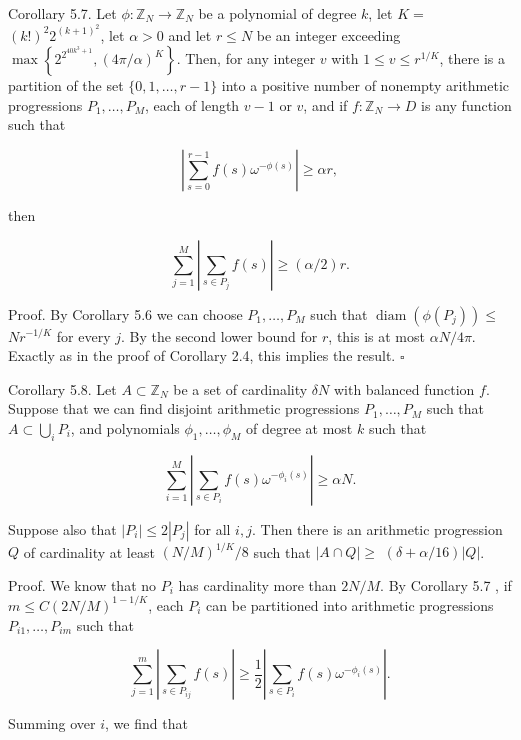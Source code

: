 \documentclass[10pt]{article}
\begin{document}
Corollary 5.7. Let $\phi: \mathbb{Z}_{N} \rightarrow \mathbb{Z}_{N}$ be a polynomial of degree $k$, let $K=$ $(k!)^{2} 2^{(k+1)^{2}}$, let $\alpha>0$ and let $r\leqslant N$ be an integer exceeding $\max \left\{2^{2^{40 k^{3}+1}},(4 \pi / \alpha)^{K}\right\}$. Then, for any integer $v$ with $1 \leqslant v \leqslant r^{1 / K}$, there is a partition of the set $\{0,1, \ldots, r-1\}$ into a positive number of nonempty arithmetic progressions $P_{1}, \ldots, P_{M}$, each of length $v-1$ or $v$, and if $f: \mathbb{Z}_{N} \rightarrow D$ is any function such that

$$
\left|\sum_{s=0}^{r-1} f(s) \omega^{-\phi(s)}\right| \geqslant \alpha r,
$$

then

$$
\sum_{j=1}^{M}\left|\sum_{s \in P_{j}} f(s)\right| \geqslant(\alpha / 2) r .
$$

Proof. By Corollary 5.6 we can choose $P_{1}, \ldots, P_{M}$ such that $\operatorname{diam}\left(\phi\left(P_{j}\right)\right) \leqslant$ $N r^{-1 / K}$ for every $j$. By the second lower bound for $r$, this is at most $\alpha N / 4 \pi$. Exactly as in the proof of Corollary 2.4, this implies the result. \(\square\)

Corollary 5.8. Let $A \subset \mathbb{Z}_{N}$ be a set of cardinality $\delta N$ with balanced function $f$. Suppose that we can find disjoint arithmetic progressions $P_{1}, \ldots, P_{M}$ such that $A \subset \bigcup_{i} P_{i}$, and polynomials $\phi_{1}, \ldots, \phi_{M}$ of degree at most $k$ such that

$$
\sum_{i=1}^{M}\left|\sum_{s \in P_{i}} f(s) \omega^{-\phi_{i}(s)}\right| \geqslant \alpha N .
$$

Suppose also that $\left|P_{i}\right| \leqslant 2\left|P_{j}\right|$ for all $i, j$. Then there is an arithmetic progression $Q$ of cardinality at least $(N / M)^{1 / K} / 8$ such that $|A \cap Q| \geqslant$ $(\delta+\alpha / 16)|Q|$.

Proof. We know that no $P_{i}$ has cardinality more than $2 N / M$. By Corollary 5.7 , if $m \leqslant C(2 N / M)^{1-1 / K}$, each $P_{i}$ can be partitioned into arithmetic progressions $P_{i 1}, \ldots, P_{i m}$ such that

$$
\sum_{j=1}^{m}\left|\sum_{s \in P_{i j}} f(s)\right| \geqslant \frac{1}{2}\left|\sum_{s \in P_{i}} f(s) \omega^{-\phi_{i}(s)}\right| .
$$

Summing over $i$, we find that
\end{document}
